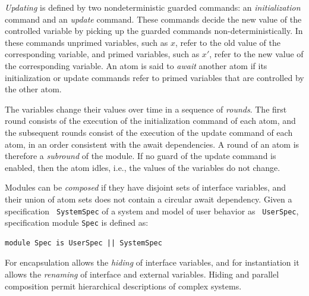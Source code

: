 \emph{Updating} is defined by two nondeterministic guarded
commands: an \emph{initialization} command and an \emph{update}
command. These commands decide the new value of the controlled
variable by picking up the guarded commands non-deterministically.
In these commands unprimed variables, such as $x$, refer to the
old value of the corresponding variable, and primed variables,
such as $x'$, refer to the new value of the corresponding
variable.  An atom is said to \emph{await} another atom if its
initialization or update commands refer to primed variables that
are controlled by the other atom.

The variables change their values over time in a sequence of
\emph{rounds}. The first round consists of the execution of the
initialization command of each atom, and the subsequent rounds
consist of the execution of the update command of each atom,  in
an order consistent with the await dependencies. A round of an
atom is therefore a \emph{subround} of the module. If no guard of
the update command is enabled, then the atom idles,
i.e., the values of the variables do not change.  %
%

Modules can be \emph{composed} if they have disjoint sets of
interface variables, and their union of atom sets does not contain
a circular await dependency. Given a specification {\tt
SystemSpec} of a system and model of user behavior as {\tt
UserSpec}, specification module {\tt Spec} is defined as:
\vspace*{-2ex}
\begin{footnotesize}
\begin{verbatim}
module Spec is UserSpec || SystemSpec
\end{verbatim}
\end{footnotesize}
\vspace*{-2ex} For encapsulation \rem{} allows the {\em hiding} of
interface variables, and for instantiation it allows the {\em
renaming} of interface and external variables. Hiding and parallel
composition permit hierarchical descriptions of complex systems.

